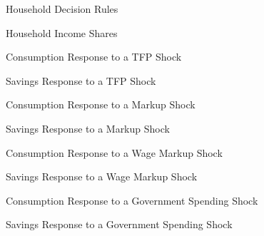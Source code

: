 \begin{figure}[ht]
    \centering
    \caption{Household Decision Rules}
    
    \label{fig:hh-pol-rules}
\end{figure}

\begin{figure}[ht]
    \centering
    \caption{Household Income Shares}
    
    \label{fig:hh-income}
\end{figure}

\begin{figure}[ht]
    \centering
    \caption{Consumption Response to a TFP Shock}
    
\end{figure}

\begin{figure}[ht]
    \centering
    \caption{Savings Response to a TFP Shock}
    
\end{figure}

\begin{figure}[ht]
    \centering
    \caption{Consumption Response to a Markup Shock}
    
\end{figure}

\begin{figure}[ht]
    \centering
    \caption{Savings Response to a Markup Shock}
    
\end{figure}

\begin{figure}[ht]
    \centering
    \caption{Consumption Response to a Wage Markup Shock}
    
\end{figure}

\begin{figure}[ht]
    \centering
    \caption{Savings Response to a Wage Markup Shock}
    
\end{figure}

\begin{figure}[ht]
    \centering
    \caption{Consumption Response to a Government Spending Shock}
    
\end{figure}

\begin{figure}[ht]
    \centering
    \caption{Savings Response to a Government Spending Shock}
    
\end{figure}

